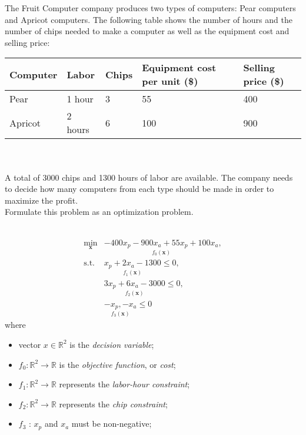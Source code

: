 \begin{homeworkProblem}
    The Fruit Computer company produces two types of computers: Pear computers 
    and Apricot computers. The following table shows the number of hours and 
    the number of chips needed to make a computer as well as the equipment cost
    and selling price:
    \\
    
    \begin{tabular}{ l l l l l }
        \hline
        Computer & Labor & Chips & Equipment cost per unit (\$) & Selling price (\$) \\ \hline
        Pear & 1 hour & 3 & 55 & 400 \\ 
        Apricot & 2 hours & 6 & 100 & 900 \\
        \hline
    \end{tabular}
    \\ \\
    
    A total of 3000 chips and 1300 hours of labor are available. The company 
    needs to decide how many computers from each type should be made in order to 
    maximize the profit.
    \\
    Formulate this problem as an optimization problem.
    \\ \\
    \begin{solution}
        \[
        \begin{array}{rl}
        \min\limits_{\boldsymbol{x}} & \underset{f_0(\boldsymbol{x})}{\boxed{-400x_p - 900x_a + 55x_p + 100x_a}}, \\ [3ex]
        \text{s.t.} & \underset{f_1(\boldsymbol{x})}{\boxed{x_p + 2x_a - 1300}} \leq 0, \\ [3ex]
                    & \underset{f_2(\boldsymbol{x})}{\boxed{3x_p + 6x_a - 3000}} \leq 0, \\ [3ex]
                    & \underset{f_3(\boldsymbol{x})}{\boxed{-x_p, -x_a}} \leq 0    
        \end{array}
        \]
        where
        \begin{itemize}
            \item vector $x \in \mathbb{R}^2$ is the \textit{decision variable};
            \item $f_0 : \mathbb{R}^2 \to \mathbb{R}$ is the \textit{objective function}, or \textit{cost};
            \item $f_1 : \mathbb{R}^2 \to \mathbb{R}$ represents the \textit{labor-hour constraint};
            \item $f_2 : \mathbb{R}^2 \to \mathbb{R}$ represents the \textit{chip constraint};
            \item $f_3$ : $x_p$ and $x_a$ must be non-negative;
        \end{itemize}
    \end{solution}
    

\end{homeworkProblem}